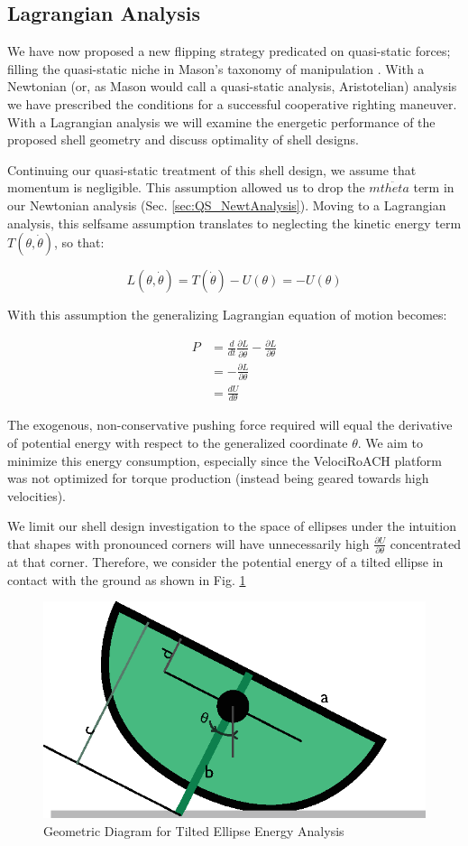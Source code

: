 \documentclass[letterpaper, 10 pt, conference]{ieeeconf}
\begin{document}
\subsection{Lagrangian Analysis \label{sec:QS_HamAnalysis}}
We have now proposed a new flipping strategy predicated on quasi-static forces; filling the quasi-static niche in Mason's taxonomy of manipulation \cite{MasonMORMBook}.
With a Newtonian (or, as Mason would call a quasi-static analysis, Aristotelian) analysis we have prescribed the conditions for a successful cooperative righting maneuver.
With a Lagrangian analysis we will examine the energetic performance of the proposed shell geometry and discuss optimality of shell designs.

Continuing our quasi-static treatment of this shell design, we assume that momentum is negligible.
This assumption allowed us to drop the $m \ddot{theta}$ term in our Newtonian analysis (Sec. \ref{sec:QS_NewtAnalysis}).
Moving to a Lagrangian analysis, this selfsame assumption translates to neglecting the kinetic energy term $T(\theta,\dot{\theta})$, so that:

$$
L(\theta,\dot{\theta}) = T(\dot{\theta}) - U(\theta) = - U(\theta)
$$

With this assumption the generalizing Lagrangian equation of motion becomes:

\begin{align}
P &= \frac{d}{dt} \frac{\partial L}{\partial \dot{\theta}} - \frac{\partial L}{\partial \theta} \\
  &= - \frac{\partial L}{\partial \theta} \\
  &= \frac{d U}{d \theta} \label{eq:QS_LagrJust}
\end{align}

The exogenous, non-conservative pushing force required will equal the derivative of potential energy with respect to the generalized coordinate $\theta$.
We aim to minimize this energy consumption, especially since the VelociRoACH platform was not optimized for torque production (instead being geared towards high velocities).

We limit our shell design investigation to the space of ellipses under the intuition that shapes with pronounced corners will have unnecessarily high $\frac{\partial U}{\partial \theta}$ concentrated at that corner.
Therefore, we consider the potential energy of a tilted ellipse in contact with the ground as shown in Fig. \ref{f:QS_energyGeometry}

\begin{figure}[ht]
\centering
\includegraphics[width=0.5\columnwidth]{QS_EnergyAnalysis.eps}
\caption{\label{f:QS_energyGeometry}Geometric Diagram for Tilted Ellipse Energy Analysis}
\end{figure}
\end{document}
